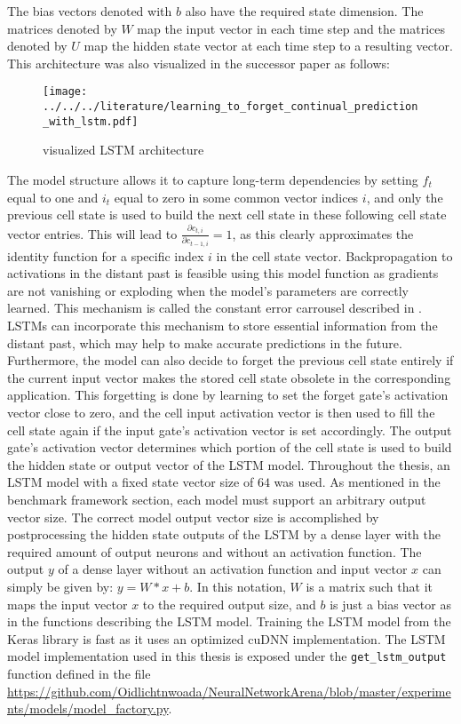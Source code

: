 \documentclass[draft,final]{vutinfth} %
\begin{document}
    The bias vectors denoted with $b$ also have the required state dimension.
    The matrices denoted by $W$ map the input vector in each time step and the matrices denoted by $U$ map the hidden state vector at each time step to a resulting vector.
    This architecture was also visualized in the successor paper as follows:
    \begin{figure}[H]
        \centering{}
        \texttt{[image: ../../../literature/learning\_to\_forget\_continual\_prediction\_with\_lstm.pdf]}
        \caption{visualized LSTM architecture \cite[p. 6]{LSTM_forget}}
        \label{fig:lstm_vis}
    \end{figure}
    The model structure allows it to capture long-term dependencies by setting $f_t$ equal to one and $i_t$ equal to zero in some common vector indices $i$, and only the previous cell state is used to build the next cell state in these following cell state vector entries.
    This will lead to $\frac{\partial{c_{t,i}}}{\partial{c_{t-1,i}}} = 1$, as this clearly approximates the identity function for a specific index $i$ in the cell state vector.
    Backpropagation to activations in the distant past is feasible using this model function as gradients are not vanishing or exploding when the model's parameters are correctly learned.
    This mechanism is called the constant error carrousel described in \cite[p. 7]{LSTM}.
    LSTMs can incorporate this mechanism to store essential information from the distant past, which may help to make accurate predictions in the future.
    Furthermore, the model can also decide to forget the previous cell state entirely if the current input vector makes the stored cell state obsolete in the corresponding application.
    This forgetting is done by learning to set the forget gate's activation vector close to zero, and the cell input activation vector is then used to fill the cell state again if the input gate's activation vector is set accordingly.
    The output gate's activation vector determines which portion of the cell state is used to build the hidden state or output vector of the LSTM model. 
    Throughout the thesis, an LSTM model with a fixed state vector size of $64$ was used. As mentioned in the benchmark framework section, each model must support an arbitrary output vector size.
    The correct model output vector size is accomplished by postprocessing the hidden state outputs of the LSTM by a dense layer with the required amount of output neurons and without an activation function.
    The output $y$ of a dense layer without an activation function and input vector $x$ can simply be given by: $y = W*x + b$.
    In this notation, $W$ is a matrix such that it maps the input vector $x$ to the required output size, and $b$ is just a bias vector as in the functions describing the LSTM model.
    Training the LSTM model from the Keras library is fast as it uses an optimized cuDNN \cite{cuDNN} implementation.
    The LSTM model implementation used in this thesis is exposed under the \texttt{get\_lstm\_output} function defined in the file \url{https://github.com/Oidlichtnwoada/NeuralNetworkArena/blob/master/experiments/models/model_factory.py}.
\end{document}
